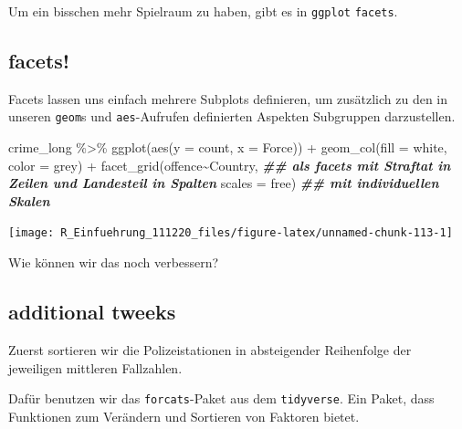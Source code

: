 \documentclass[
]{book}
\newenvironment{Shaded}{\begin{snugshade}}{\end{snugshade}}
\newcommand{\AttributeTok}[1]{\textcolor[rgb]{0.77,0.63,0.00}{#1}}
\newcommand{\DocumentationTok}[1]{\textcolor[rgb]{0.56,0.35,0.01}{\textbf{\textit{#1}}}}
\newcommand{\FunctionTok}[1]{\textcolor[rgb]{0.00,0.00,0.00}{#1}}
\newcommand{\NormalTok}[1]{#1}
\newcommand{\SpecialCharTok}[1]{\textcolor[rgb]{0.00,0.00,0.00}{#1}}
\newcommand{\StringTok}[1]{\textcolor[rgb]{0.31,0.60,0.02}{#1}}
\begin{document}
Um ein bisschen mehr Spielraum zu haben, gibt es in \texttt{ggplot} \texttt{facets}.

\hypertarget{facets}{%
\subsection{facets!}\label{facets}}

Facets lassen uns einfach mehrere Subplots definieren, um zusätzlich zu den in unseren \texttt{geom}s und \texttt{aes}-Aufrufen definierten Aspekten Subgruppen darzustellen.

\begin{Shaded}
\begin{Highlighting}[]
\NormalTok{crime\_long }\SpecialCharTok{\%\textgreater{}\%}  
  \FunctionTok{ggplot}\NormalTok{(}\FunctionTok{aes}\NormalTok{(}\AttributeTok{y =}\NormalTok{ count,}
             \AttributeTok{x =}\NormalTok{ Force)) }\SpecialCharTok{+}
  \FunctionTok{geom\_col}\NormalTok{(}\AttributeTok{fill =} \StringTok{\textquotesingle{}white\textquotesingle{}}\NormalTok{,}
           \AttributeTok{color =} \StringTok{\textquotesingle{}grey\textquotesingle{}}\NormalTok{) }\SpecialCharTok{+}
  \FunctionTok{facet\_grid}\NormalTok{(offence}\SpecialCharTok{\textasciitilde{}}\NormalTok{Country, }\DocumentationTok{\#\# als facets mit Straftat in Zeilen und Landesteil in Spalten}
             \AttributeTok{scales =} \StringTok{\textquotesingle{}free\textquotesingle{}}\NormalTok{) }\DocumentationTok{\#\# mit individuellen Skalen}
\end{Highlighting}
\end{Shaded}

\begin{center}\texttt{[image: R\_Einfuehrung\_111220\_files/figure-latex/unnamed-chunk-113-1]} \end{center}

Wie können wir das noch verbessern?

\hypertarget{additional-tweeks}{%
\subsection{additional tweeks}\label{additional-tweeks}}

Zuerst sortieren wir die Polizeistationen in absteigender Reihenfolge der jeweiligen mittleren Fallzahlen.

Dafür benutzen wir das \texttt{forcats}-Paket aus dem \texttt{tidyverse}. Ein Paket, dass Funktionen zum Verändern und Sortieren von Faktoren bietet.
\end{document}
